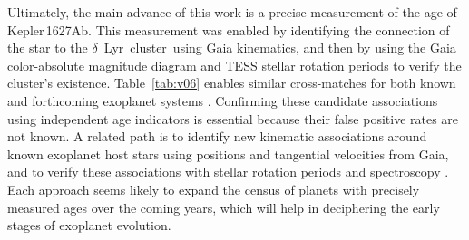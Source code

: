 \documentclass[12pt,modern,twocolumn,tighten]{aastex63}
\newcommand{\cn}{$\delta$\ Lyr\ cluster} %
\newcommand{\pn}{Kepler\,1627Ab} %
\begin{document}
Ultimately, the main advance of this work is a precise measurement of
the age of \pn.   This measurement was enabled by identifying the
connection of the star to the \cn\ using Gaia kinematics, and then by
using the Gaia color-absolute magnitude diagram and TESS stellar
rotation periods to verify the cluster's existence.
Table~\ref{tab:v06} enables similar cross-matches for both known and
forthcoming exoplanet systems \citep[{\it
e.g.},][]{guerrero_tess_2021}. Confirming these candidate associations
using independent age indicators is essential because their false
positive rates are not known.  A related path is to identify new
kinematic associations around known exoplanet host stars using
positions and tangential velocities from Gaia, and to verify
these associations with stellar rotation periods and spectroscopy
\citep[{\it e.g.},][]{tofflemire_tess_2021}.  Each approach seems
likely to expand the census of planets with precisely measured ages
over the coming years, which will help in deciphering the early stages
of exoplanet evolution.




\clearpage
\acknowledgements
\raggedbottom
\end{document}

